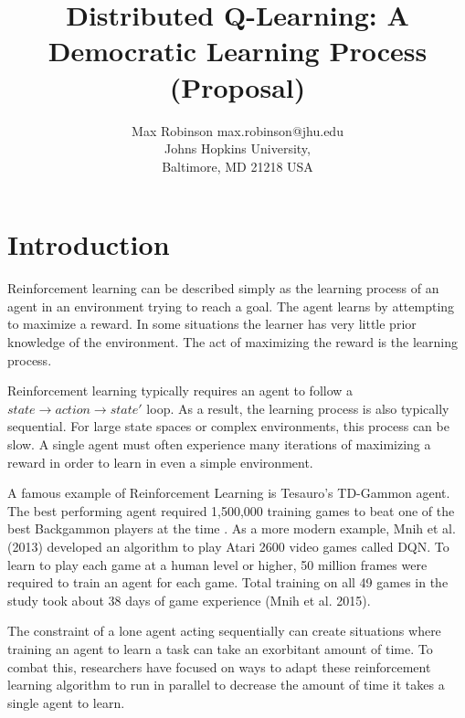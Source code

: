 \documentclass[jair,twoside,11pt,theapa]{article}
\begin{document}
\title{Distributed Q-Learning: A Democratic Learning Process (Proposal)}

\author{\name Max Robinson \email max.robinson@jhu.edu \\
       \addr Johns Hopkins University,\\
       Baltimore, MD 21218 USA
   }


\maketitle

\begin{abstract}

\end{abstract}

\section{Introduction}
\label{Introduction}
Reinforcement learning can be described simply as the learning process of an agent in an environment trying to reach a goal. 
The agent learns by attempting to maximize a reward. In some situations the learner has very little prior knowledge of the environment. 
The act of maximizing the reward is the learning process.

Reinforcement learning typically requires an agent to follow a $state \to action \to state'$ loop. As a result, the learning process is also typically sequential. 
For large state spaces or complex environments, this process can be slow. A single agent must often experience many iterations of maximizing 
a reward in order to learn in even a simple environment.

A famous example of Reinforcement Learning is Tesauro's TD-Gammon agent.
The best performing agent required 1,500,000 training games to beat one of the best Backgammon players at the time \cite{Tesauro:1995:TDL:203330.203343}.
As a more modern example, Mnih et al. (2013) \nocite{Mnih2013} developed an algorithm to play Atari 2600 video games called DQN. To learn to play each game at a human level or higher,
50 million frames were required to train an agent for each game. Total training on all 49 games in the study took about 38 days of game experience (Mnih et al. 2015). 

The constraint of a lone agent acting sequentially can create situations where training an agent to learn a task can take an exorbitant amount of time. 
To combat this, researchers have focused on ways to adapt these reinforcement learning algorithm to run in parallel to decrease the amount of time it takes a single agent to learn. 
\end{document}
